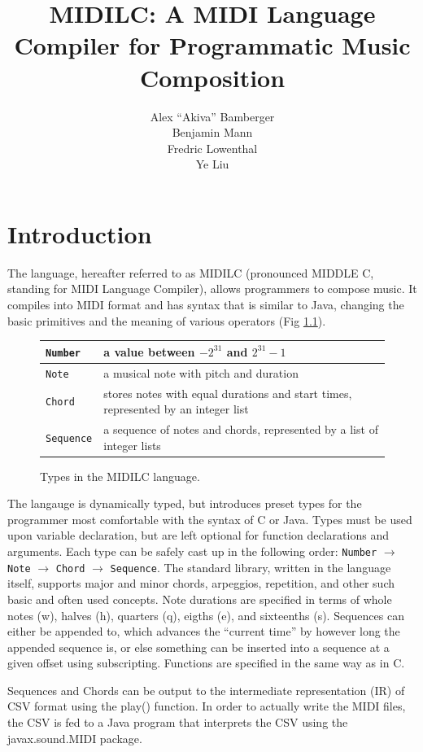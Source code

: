 \documentclass[12pt,A4]{book}
\title{MIDILC:  A MIDI Language Compiler for Programmatic Music Composition}
\author{Alex ``Akiva'' Bamberger \\ Benjamin Mann \\ Fredric Lowenthal \\ Ye Liu}
\date{}
\begin{document}
\maketitle
\newpage
\tableofcontents
\newpage
\chapter{Introduction}
The language, hereafter referred to as MIDILC (pronounced MIDDLE C, standing for MIDI
Language Compiler), allows programmers to compose music. It compiles into MIDI format and
has syntax that is similar to Java, changing the basic primitives and the meaning of various
operators (Fig \ref{fig:types_in_midilc}).
\begin{figure}
\center
\begin{tabular}{|p{}|p{}|}
\hline
\verb|Number| & a value between $-2^{31}$ and $2^{31}-1$\\ \hline
\verb|Note| & a musical note with pitch and duration \\ \hline
\verb|Chord| & stores notes with equal durations and start times, represented by an integer list \\ \hline
\verb|Sequence| & a sequence of notes and chords, represented by a list of integer lists \\ \hline
\end{tabular}
\caption{Types in the MIDILC language. }
\label{fig:types_in_midilc}
\end{figure}

The langauge is dynamically typed, but introduces preset types for the programmer most comfortable with the syntax of C or Java. Types must be used upon variable declaration, but are left optional for function declarations and arguments. Each type can be safely cast up in the following order: \verb|Number| $\rightarrow$ \verb|Note| $\rightarrow$ \verb|Chord| $\rightarrow$ \verb|Sequence|. The standard library, written in the language itself, supports major and minor chords, arpeggios, repetition, and other such basic and often used concepts. Note durations are specified in terms of whole notes (w), halves (h), quarters (q), eigths (e), and sixteenths (s). Sequences can either be appended to, which advances the ``current time'' by however long the appended sequence is, or else something can be inserted into a sequence at a given offset using subscripting. Functions are specified in the same way as in C.

Sequences and Chords can be output to the intermediate representation (IR) of CSV format using the play() function. In order to actually write the MIDI files, the CSV is fed to a Java program that interprets the CSV using the javax.sound.MIDI package.
\end{document}
